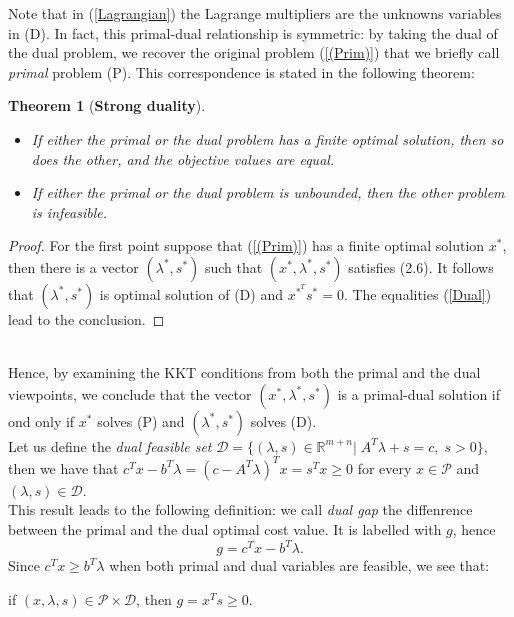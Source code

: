 \documentclass[a4paper,10 pt,titlepage,twoside]{book}
\theoremstyle{plain}
\newtheorem{thm}{Theorem}[chapter]
\theoremstyle{definition}
\theoremstyle{remark}
\begin{document}
Note that in (\ref{Lagrangian}) the Lagrange multipliers are the unknowns variables in (D). In fact, this primal-dual relationship is symmetric: by taking the dual of the dual problem, we recover the original problem (\ref{(Prim)}) that we briefly call \textit{primal} problem (P). This correspondence is stated in the following theorem:
\begin{thm}[\textbf{Strong duality}] 
	\begin{itemize}
		\
		\item If either the primal or the dual problem has a finite optimal solution, then so does the other, and the objective values are equal.
		\item If either the primal or the dual problem is unbounded, then the other problem is infeasible.
	\end{itemize}
\end{thm}
\begin{proof}
For the first point suppose that (\ref{(Prim)}) has a finite optimal solution $x^{*}$, then there is a vector $(\lambda^{*},s^{*})$ such that $\left( x^{*},\lambda^{*},s^{*}\right)$ satisfies (2.6). It follows that $\left(\lambda^{*},s^{*}\right)$ is optimal solution of (D) and $x^{*}^{T}s^{*}=0$. The equalities (\ref{Dual}) lead to the conclusion. 
\end{proof}
\\[0.5 cm] Hence, by examining the KKT conditions from both the primal and the dual viewpoints, we conclude that the vector $(x^{*},\lambda^{*},s^{*})$ is a primal-dual solution if ond only if $x^{*}$ solves (P) and $(\lambda^{*},s^{*})$ solves (D).\\[1cm]
Let us define the \textit{dual feasible set} $\mathcal{D}=\{(\lambda,s)\in\mathbb{R}^{m+n}|\;A^{T}\lambda+s= c,\;s>0\}$, then we have that $c^{T}x-b^{T}\lambda=\left(c-A^{T}\lambda\right)^{T}x=s^{T}x \geq0$ for every $x\in\mathcal{P}$ and $\left(\lambda,s\right)\in\mathcal{D}$.\\
This result leads to the following definition: we call \textit{dual gap} the diffenrence between the primal and the dual optimal cost value. It is labelled with $g$, hence
\begin{equation}\label{dualgap}
g = c^{T}x - b^{T}\lambda.
\end{equation}
Since $c^{T}x\geq b^{T}\lambda$ when both primal and dual variables are feasible, we see that:\begin{center}
	if $(x,\lambda,s)\in\mathcal{P}\times\mathcal{D}$, then $g= x^{T}s \geq0$.
\end{center}
\end{document}
